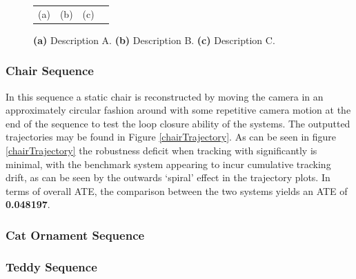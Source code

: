 \begin{figure}[h]
\begin{tabular}{cccc}
		(a)&(b)&(c)
	\end{tabular}
	\caption{
		\textbf{(a)} Description A.
		\textbf{(b)} Description B.
		\textbf{(c)} Description C.
	}
\label{fig:tumTrajectories}
\vspace{-1.5\baselineskip}
\end{figure}

\subsubsection{Chair Sequence}
In this sequence a static chair is reconstructed by moving the camera in an approximately circular fashion around with some repetitive camera motion at the end of the sequence to test 
the loop closure ability of the systems. The outputted trajectories may be found in Figure \ref{chairTrajectory}.
As can be seen in figure \ref{chairTrajectory} the robustness deficit when tracking with significantly is minimal, with the benchmark system appearing to incur cumulative tracking drift, as can be seen 
by the outwards `spiral' effect in the trajectory plots. In terms of overall ATE, the comparison between the two systems yields an ATE of \textbf{0.048197}.

\subsubsection{Cat Ornament Sequence}
%

\subsubsection{Teddy Sequence}